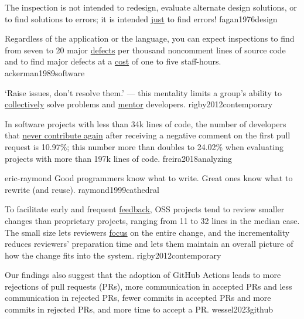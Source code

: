 \documentclass{article}
\begin{document}

  {The inspection is not intended to redesign, evaluate alternate design solutions, or to find solutions to errors; it is intended \ul{just} to find errors!}
  {fagan1976design}

  {Regardless of the application or the language, you can expect inspections to find from seven to 20 major \ul{defects} per thousand noncomment lines of source code and to find major defects at a \ul{cost} of one to five staff-hours.}
  {ackerman1989software}

  {`Raise issues, don't resolve them.' --- this mentality limits a group's ability to \ul{collectively} solve problems and \ul{mentor} developers.}
  {rigby2012contemporary}

  {In software projects with less than 34k lines of code, the number of developers that \ul{never contribute again} after receiving a negative comment on the first pull request is 10.97\%; this number more than doubles to 24.02\% when evaluating projects with more than 197k lines of code.}
  {freira2018analyzing}



\qte
  {eric-raymond}
  {Good programmers know what to write. Great ones know what to rewrite (and reuse).}
  {raymond1999cathedral}

  {To facilitate early and frequent \ul{feedback}, OSS projects tend to review smaller changes than proprietary projects, ranging from 11 to 32 lines in the median case. The small size lets reviewers \ul{focus} on the entire change, and the incrementality reduces reviewers’ preparation time and lets them maintain an overall picture of how the change fits into the system.}
  {rigby2012contemporary}




  {Our findings also suggest that the adoption of GitHub Actions leads to more rejections of pull requests (PRs), more communication in accepted PRs and less communication in rejected PRs, fewer commits in accepted PRs and more commits in rejected PRs, and more time to accept a PR.}
  {wessel2023github}
\end{document}
